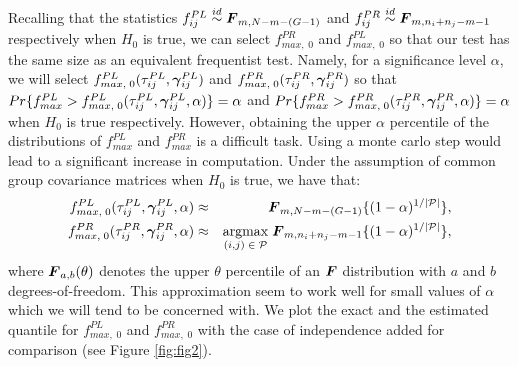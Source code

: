 \documentclass[times,sort&compress,3p]{elsarticle}
\theoremstyle{plain}%
\theoremstyle{definition}
\def\be{\begin{eqnarray}}
\def\ee{\end{eqnarray}}
\newcommand{\uF}       {\mbox{\boldmath$F$}}
\newcommand{\ugamma}            {\mbox{\boldmath$\gamma$}}
\begin{document}
Recalling that the statistics $f^{PL}_{ij} \stackrel{id}{\sim} \uF_{m, N - m- (G-1)} $ and $f^{PR}_{ij} \stackrel{id}{\sim} \uF_{m, n_i+n_j - m- 1}$ respectively when $H_0$ is true, we can select $f^{PR}_{max,\;0}$ and $f^{PL}_{max,\;0}$ so that our test has the same size as an equivalent frequentist test. Namely, for a significance level $\alpha$, we will select $f^{PL}_{max,\;0}(\tau^{PL}_{ij},\ugamma^{PL}_{ij})$ and $f^{PR}_{max,\;0}(\tau^{PR}_{ij},\ugamma^{PR}_{ij})$ so that 
$Pr\{f^{PL}_{max} > f^{PL}_{max,\;0}(\tau^{PL}_{ij},\ugamma^{PL}_{ij}, \alpha)\} = \alpha$ and $Pr\{f^{PR}_{max} > f^{PR}_{max,\;0}(\tau^{PR}_{ij},\ugamma^{PR}_{ij}, \alpha)\} = \alpha$ when $H_{0}$ is true respectively. However, obtaining the upper $\alpha$ percentile of the distributions of $f^{PL}_{max}$ and $f^{PR}_{max}$ is a difficult task. Using a monte carlo step would lead to a significant increase in computation. Under the assumption of common group covariance matrices when $H_0$ is true, we have that: 
\be
 f^{PL}_{max,\;0}(\tau^{PL}_{ij},\ugamma^{PL}_{ij}, \alpha) &\approx& \uF_{m, N -m -(G-1)}\{(1 - \alpha)^{1/|\mathcal{P}|}\}, \nonumber\\
 f^{PR}_{max,\;0}(\tau^{PR}_{ij},\ugamma^{PR}_{ij}, \alpha) &\approx& \underset{(i,j)\; \in\; %
 \mathcal{P}}{\mathrm{argmax}}\; \uF_{m, n_{i}+n_{j} -m -1}\{ (1 -\alpha)^{1/|\mathcal{P}|}\}, \nonumber
 \ee
where $\uF_{a, b}(\theta)$ denotes the upper $\theta$ percentile of an $\uF$ distribution with $a$ and $b$ degrees-of-freedom. This approximation seem to work well for small values of $\alpha$ which we will tend to be concerned with. We plot the exact and the estimated quantile for $f^{PL}_{max,\;0}$ and $f^{PR}_{max,\;0}$ with the case of independence added for comparison (see Figure \ref{fig:fig2}).

\end{document}
